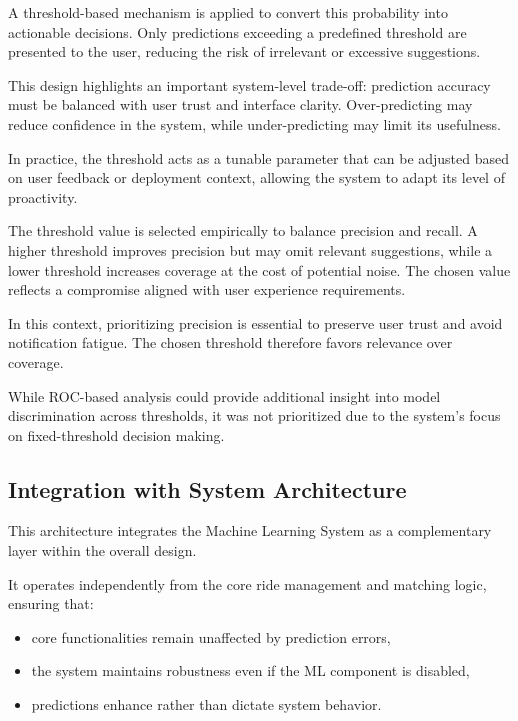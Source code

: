 A threshold-based mechanism is applied to convert this probability into actionable decisions. Only predictions exceeding a predefined threshold are presented to the user, reducing the risk of irrelevant or excessive suggestions.

This design highlights an important system-level trade-off: prediction accuracy must be balanced with user trust and interface clarity. Over-predicting may reduce confidence in the system, while under-predicting may limit its usefulness.

In practice, the threshold acts as a tunable parameter that can be adjusted based on user feedback or deployment context, allowing the system to adapt its level of proactivity.

The threshold value is selected empirically to balance precision and recall. A higher threshold improves precision but may omit relevant suggestions, while a lower threshold increases coverage at the cost of potential noise. The chosen value reflects a compromise aligned with user experience requirements.

In this context, prioritizing precision is essential to preserve user trust and avoid notification fatigue. The chosen threshold therefore favors relevance over coverage.

While ROC-based analysis could provide additional insight into model discrimination across thresholds, it was not prioritized due to the system's focus on fixed-threshold decision making.

\subsection{Integration with System Architecture}

This architecture integrates the Machine Learning System as a complementary layer within the overall design.

It operates independently from the core ride management and matching logic, ensuring that:

\begin{itemize}
    \item core functionalities remain unaffected by prediction errors,
    \item the system maintains robustness even if the ML component is disabled,
    \item predictions enhance rather than dictate system behavior.
\end{itemize}

